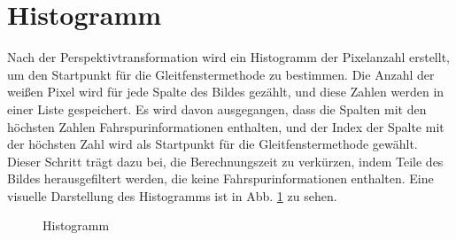 \documentclass[arbeit=studie,oneside,BCOR=12mm]{ArbeitRST}
\begin{document}
\section{Histogramm}

Nach der Perspektivtransformation wird ein Histogramm der Pixelanzahl erstellt,
um den Startpunkt für die Gleitfenstermethode zu bestimmen. Die Anzahl der
weißen Pixel wird für jede Spalte des Bildes gezählt, und diese Zahlen werden
in einer Liste gespeichert. Es wird davon ausgegangen, dass die Spalten mit den
höchsten Zahlen Fahrspurinformationen enthalten, und der Index der Spalte mit
der höchsten Zahl wird als Startpunkt für die Gleitfenstermethode gewählt.
Dieser Schritt trägt dazu bei, die Berechnungszeit zu verkürzen, indem Teile
des Bildes herausgefiltert werden, die keine Fahrspurinformationen enthalten.
Eine visuelle Darstellung des Histogramms ist in Abb. \ref{hist} zu sehen. \\

\begin{figure}[h]
    \centering
    \caption{Histogramm}
    \label{hist}
\end{figure}
\end{document}
